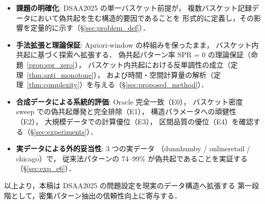 \begin{itemize}
    \item \textbf{課題の明確化}: DSAA2025 の単一バスケット前提が，
    複数バスケット記録データにおいて偽共起を生む構造的要因であることを
    形式的に定義し，その影響を定量的に示す（\S\ref{sec:problem_def}）．

    \item \textbf{手法拡張と理論保証}: Apriori-window の枠組みを保ったまま，
    バスケット内共起に基づく探索へ拡張する．
    偽共起パターン率 SPR = 0 の理論保証（命題~\ref{prop:spr_zero}），
    バスケット内共起における反単調性の成立（定理~\ref{thm:anti_monotone}），
    および時間・空間計算量の解析（定理~\ref{thm:complexity}）を与える（\S\ref{sec:proposed_method}）．

    \item \textbf{合成データによる系統的評価}: Oracle 完全一致（E0），
    バスケット密度 sweep での偽共起爆発と完全排除（E1），
    構造パラメータへの頑健性（E2），
    大規模データでの計算優位（E3），
    区間品質の優位（E4）を確認する（\S\ref{sec:experiments}）．

    \item \textbf{実データによる外的妥当性}: 3 つの実データ
    （dunnhumby / onlineretail / chicago）で，
    従来法パターンの 74--99\% が偽共起であることを実証する（\S\ref{sec:exp_e6}）．
\end{itemize}

以上より，本稿は DSAA2025 の問題設定を現実のデータ構造へ拡張する
第一段階として，密集パターン抽出の信頼性向上に寄与する．
